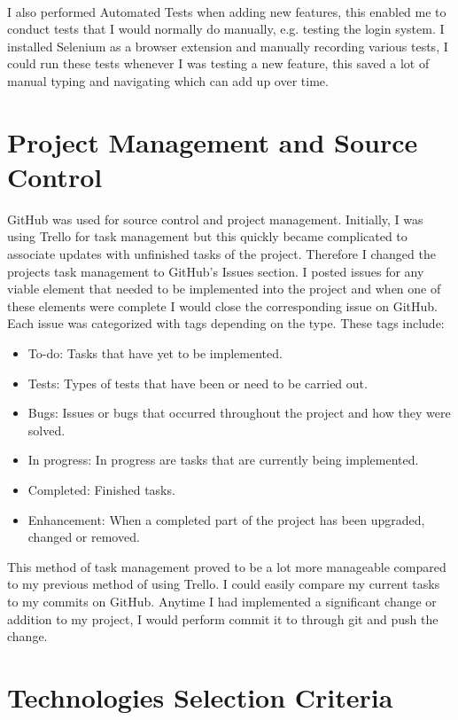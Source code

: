 \paragraph{}
I also performed Automated Tests when adding new features, this enabled me to conduct tests that I would normally do manually, e.g. testing the login system. I installed Selenium \cite{selenium} as a browser extension and manually recording various tests, I could run these tests whenever I was testing a new feature, this saved a lot of manual typing and navigating which can add up over time.
\section{Project Management and Source Control}
GitHub was used for source control and project management. Initially, I was using Trello for task management but this quickly became complicated to associate updates with unfinished tasks of the project. Therefore I changed the projects task management to GitHub’s Issues section. I posted issues for any viable element that needed to be implemented into the project and when one of these elements were complete I would close the corresponding issue on GitHub. Each issue was categorized with tags depending on the type. These tags include:
\begin{itemize}
	\item To-do: Tasks that have yet to be implemented.
	\item Tests: Types of tests that have been or need to be carried out.
	\item Bugs: Issues or bugs that occurred throughout the project and how they were solved.
	\item In progress: In progress are tasks that are currently being implemented.
	\item Completed: Finished tasks.
	\item Enhancement: When a completed part of the project has been upgraded, changed or removed.
\end{itemize}
This method of task management proved to be a lot more manageable compared to my previous method of using Trello. I could easily compare my current tasks to my commits on GitHub. Anytime I had implemented a significant change or addition to my project, I would perform commit it to through git and push the change.

\section{Technologies Selection Criteria}
